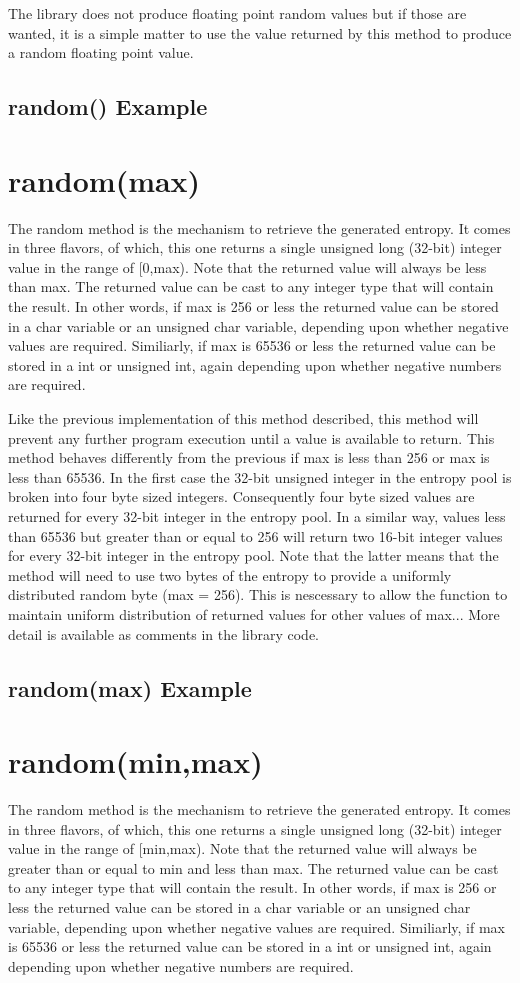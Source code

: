 \documentclass[10pt]{report}
\newcommand{\code}[2]{
 \hrulefill
 \subsection*{#1}
 
 \vspace{2em}
}
\begin{document}
The library does not produce floating point random values but if those are wanted, it is a simple matter to 
use the value returned by this method to produce a random floating point value.

\code{random() Example}{available_example.ino}

\section{random(max)}

The random method is the mechanism to retrieve the generated entropy.  It comes in three flavors, of which, 
this one returns a single unsigned long (32-bit) integer value in the range of [0,max).  Note that the 
returned value will always be less than max.  The returned value can be cast to any integer type that will 
contain the result.  In other words, if max is 256 or less the returned value can be stored in a char 
variable or an unsigned char variable, depending upon whether negative values are required. Similiarly, if 
max is 65536 or less the returned value can be stored in a int or unsigned int, again depending upon whether 
negative numbers are required.  

Like the previous implementation of this method described, this method will prevent any further program 
execution until a value is available to return.  This method behaves differently from the previous if max is 
less than 256 or max is less than 65536.  In the first case the 32-bit unsigned integer in the entropy pool is 
broken into four byte sized integers. Consequently four byte sized values are returned for every 32-bit 
integer in the entropy pool.  In a similar way, values less than 65536 but greater than or equal to 256 will 
return two 16-bit integer values for every 32-bit integer in the entropy pool.  Note that the latter means 
that the method will need to use two bytes of the entropy to provide a uniformly distributed random byte 
(max = 256).  This is nescessary to allow the function to maintain uniform distribution of returned values 
for other values of max...  More detail is available as comments in the library code.

\code{random(max) Example}{random_max_example.ino}

\section{random(min,max)}

The random method is the mechanism to retrieve the generated entropy.  It comes in three flavors, of which, 
this one returns a single unsigned long (32-bit) integer value in the range of [min,max).  Note that the 
returned value will always be greater than or equal to min and less than max.  The returned value can be cast 
to any integer type that will contain the result.  In other words, if max is 256 or less the returned value 
can be stored in a char variable or an unsigned char variable, depending upon whether negative values are 
required. Similiarly, if max is 65536 or less the returned value can be stored in a int or unsigned int, 
again depending upon whether negative numbers are required.  
\end{document}
